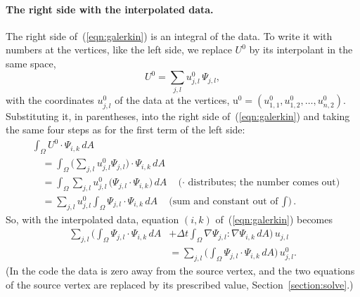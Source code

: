 \paragraph{The right side with the interpolated data.} The right side of~(\ref{eqn:galerkin}) is an integral of the data. To write it with numbers at the vertices, like the left side, we replace $U^0$ by its interpolant in the same space,
\begin{equation*}
U^0 = \sum_{j,l} u^0_{j,l}\,\Psi_{j,l} ,
\end{equation*}
with the coordinates $u^0_{j,l}$ of the data at the vertices, $\mathrm u^0 = (u^0_{1,1}, u^0_{1,2}, \ldots, u^0_{n,2})$. Substituting it, in parentheses, into the right side of~(\ref{eqn:galerkin}) and taking the same four steps as for the first term of the left side:
\begin{align*}
&\int_\Omega U^0 \cdot \Psi_{i,k}\, dA \\
&\quad= \int_\Omega \Big(\sum_{j,l} u^0_{j,l}\Psi_{j,l}\Big) \cdot \Psi_{i,k}\, dA \\
&\quad= \int_\Omega \sum_{j,l} u^0_{j,l}\, \big(\Psi_{j,l} \cdot \Psi_{i,k}\big)\, dA \quad \text{($\cdot$ distributes; the number comes out)}\\
&\quad= \sum_{j,l} u^0_{j,l} \int_\Omega \Psi_{j,l} \cdot \Psi_{i,k}\, dA \quad \text{(sum and constant out of $\textstyle\int$)} .
\end{align*}
So, with the interpolated data, equation $(i, k)$ of~(\ref{eqn:galerkin}) becomes
\begin{equation*}
\begin{split}
\sum_{j,l} \Big( \int_\Omega \Psi_{j,l} \cdot \Psi_{i,k}\, dA &+ \Delta t \int_\Omega \nabla \Psi_{j,l} : \nabla \Psi_{i,k}\, dA \Big)\, u_{j,l} \\
&= \sum_{j,l} \Big(\int_\Omega \Psi_{j,l}\cdot \Psi_{i,k}\, dA\Big)\, u^0_{j,l} .
\end{split}
\end{equation*}
(In the code the data is zero away from the source vertex, and the two equations of the source vertex are replaced by its prescribed value, Section~\ref{section:solve}.)

